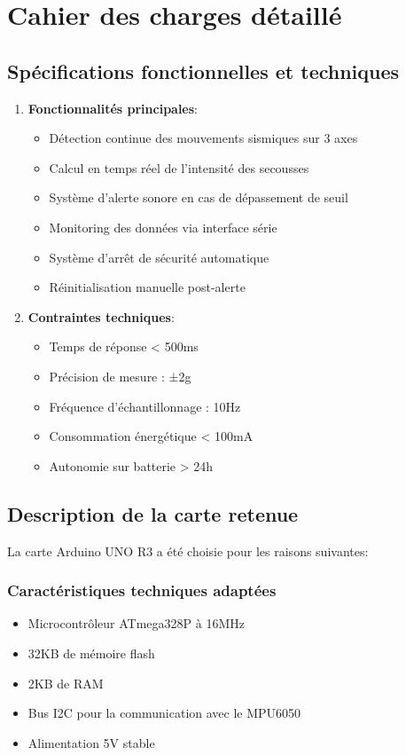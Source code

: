 \documentclass[12pt,a4paper]{article}
\begin{document}
\section{Cahier des charges détaillé}
\subsection{Spécifications fonctionnelles et techniques}
\begin{enumerate}
\item \textbf{Fonctionnalités principales}:
\begin{itemize}
\item Détection continue des mouvements sismiques sur 3 axes
\item Calcul en temps réel de l'intensité des secousses
\item Système d'alerte sonore en cas de dépassement de seuil
\item Monitoring des données via interface série
\item Système d'arrêt de sécurité automatique
\item Réinitialisation manuelle post-alerte
\end{itemize}

\item \textbf{Contraintes techniques}:
\begin{itemize}
\item Temps de réponse < 500ms
\item Précision de mesure : ±2g
\item Fréquence d'échantillonnage : 10Hz
\item Consommation énergétique < 100mA
\item Autonomie sur batterie > 24h
\end{itemize}
\end{enumerate}

\subsection{Description de la carte retenue}
La carte Arduino UNO R3 a été choisie pour les raisons suivantes:

\subsubsection{Caractéristiques techniques adaptées}
\begin{itemize}
\item Microcontrôleur ATmega328P à 16MHz
\item 32KB de mémoire flash
\item 2KB de RAM
\item Bus I2C pour la communication avec le MPU6050
\item Alimentation 5V stable
\end{itemize}
\end{document}
